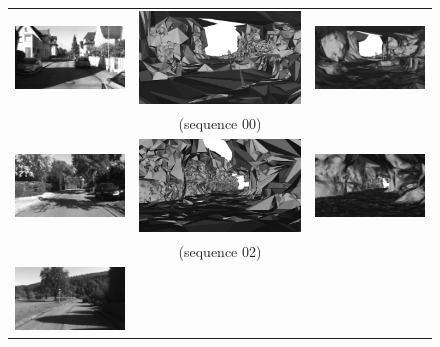 \begin{figure}[tp]
\centering
\setlength{\tabcolsep}{1px}
\begin{tabular}{ccc}
\includegraphics[height=0.18\textwidth]{./img/ch-incr-dens/00borig00}&
\includegraphics[height=0.18\textwidth]{./img/ch-incr-dens/00binit00}&
\includegraphics[height=0.18\textwidth]{./img/ch-incr-dens/00bref00}\\
&(sequence 00)&\\
\includegraphics[height=0.18\textwidth]{./img/ch-incr-dens/02aorig00}&
\includegraphics[height=0.18\textwidth]{./img/ch-incr-dens/02ainit00}&
\includegraphics[height=0.18\textwidth]{./img/ch-incr-dens/02aref00}\\
&(sequence 02)&\\
\includegraphics[height=0.18\textwidth]{./img/ch-incr-dens/03aorig00}&

\end{tabular}
\end{figure}

